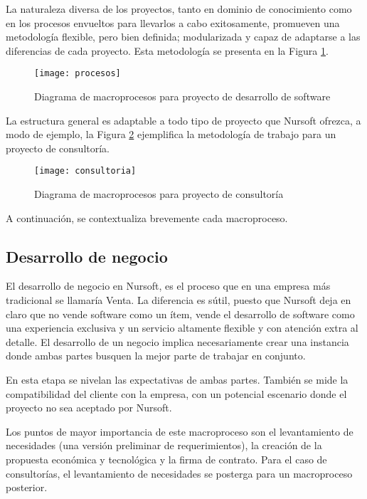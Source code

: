 \newpage 

La naturaleza diversa de los proyectos, tanto en dominio de conocimiento como en los procesos envueltos para 
llevarlos a cabo exitosamente, promueven una metodología flexible, pero bien definida; modularizada
y capaz de adaptarse a las diferencias de cada proyecto. Esta metodología se presenta en la Figura \ref{fig:procesos}.


\begin{figure}[h]
    \centering
    \texttt{[image: procesos]}
    \caption{Diagrama de macroprocesos para proyecto de desarrollo de software}
    \label{fig:procesos}
\end{figure}

La estructura general es adaptable a todo tipo de proyecto que Nursoft ofrezca, a modo de ejemplo, la Figura \ref{fig:consultoria}
ejemplifica la metodología de trabajo para un proyecto de consultoría.

\begin{figure}[h]
    \centering
    \texttt{[image: consultoria]}
    \caption{Diagrama de macroprocesos para proyecto de consultoría}
    \label{fig:consultoria}
\end{figure}


A continuación, se contextualiza brevemente cada macroproceso.

\subsection{Desarrollo de negocio}

El desarrollo de negocio en Nursoft, es el proceso que en una empresa más tradicional se llamaría Venta.
La diferencia es sútil, puesto que Nursoft deja en claro que no vende software como un ítem, vende el desarrollo
de software como una experiencia exclusiva y un servicio altamente flexible y con atención extra al detalle. 
El desarrollo de un negocio implica necesariamente crear una instancia donde ambas partes busquen la mejor parte de
trabajar en conjunto.

En esta etapa se nivelan las expectativas de ambas partes. También se mide la
compatibilidad del cliente con la empresa, con un potencial escenario donde el proyecto no sea aceptado por Nursoft.

Los puntos de mayor importancia de este macroproceso son el levantamiento de necesidades (una versión preliminar de requerimientos),
la creación de la propuesta económica y tecnológica y la firma de contrato. Para el caso de consultorías,
el levantamiento de necesidades se posterga para un macroproceso posterior.

